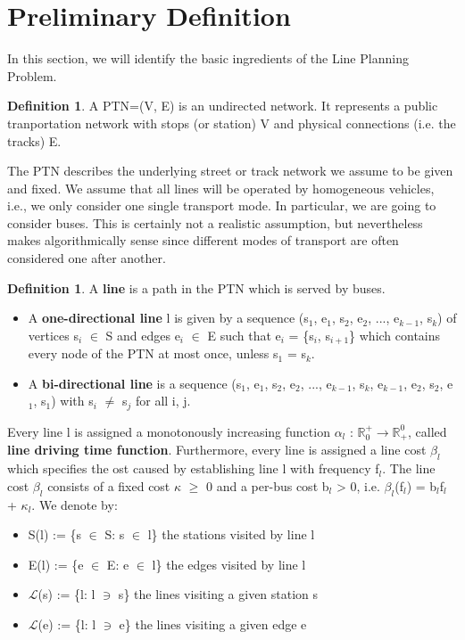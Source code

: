 \documentclass[
  twoside,
  12pt, a4paper,
  footinclude=true,
  headinclude=true,
  cleardoublepage=empty
]{scrbook}
\theoremstyle{definition}
\newtheorem{definition}[theorem]{Definition}
\begin{document}
\section{Preliminary Definition}
In this section, we will identify the basic ingredients of the Line Planning Problem.
\begin{definition}
A PTN=(V, E) is an undirected network. It represents a public tranportation network with stops (or station) V and physical connections (i.e. the tracks) E.
\end{definition}
The PTN describes the underlying street or track network we assume to be given and fixed. We assume that all lines will be operated by homogeneous vehicles, i.e., we only consider one single transport mode. In particular, we are going to consider buses. This is certainly not a realistic assumption, but nevertheless makes algorithmically sense since different modes of transport are often considered one after another.
\begin{definition}
A \textbf{line} is a path in the PTN which is served by buses. 
\begin{itemize}
\item A \textbf{one-directional line} l is given by a sequence (s$_1$, e$_1$, s$_2$, e$_2$, ..., e$_{k-1}$, s$_k$) of vertices s$_i$ $\in$ S and edges e$_i$ $\in$ E such that e$_i$ = \{s$_i$, s$_{i+1}$\} which contains every node of the PTN at most once, unless s$_1$ = s$_k$.
\item A \textbf{bi-directional line} is a sequence (s$_1$, e$_1$, s$_2$, e$_2$, ..., e$_{k-1}$, s$_k$, e$_{k-1}$, e$_2$, s$_2$, e$_1$, s$_1$) with s$_i$ $\ne$ s$_j$ for all i, j.
\end{itemize}
\end{definition}
Every line l is assigned a monotonously increasing function $\alpha_l$ : $\mathbb{R}^+_0 \rightarrow \mathbb{R}^0_+$, called \textbf{line driving time function}. \newline
Furthermore, every line is assigned a line cost $\beta_l$ which specifies the ost caused by establishing line l with frequency f$_l$. The line cost $\beta_l$ consists of a fixed cost $\kappa$ $\ge$ 0 and a per-bus cost b$_l$ > 0, i.e. $\beta_l$(f$_l$) = b$_l$f$_l$ + $\kappa_l$. \newline
We denote by:
\begin{itemize}
\item S(l) := \{s $\in$ S: s $\in$ l\} the stations visited by line l
\item E(l) := \{e $\in$ E: e $\in$ l\} the edges visited by line l
\item $\mathcal{L}$(s) := \{l: l $\ni$ s\} the lines visiting a given station s
\item $\mathcal{L}$(e) := \{l: l $\ni$ e\} the lines visiting a given edge e
\end{itemize}
\end{document}
